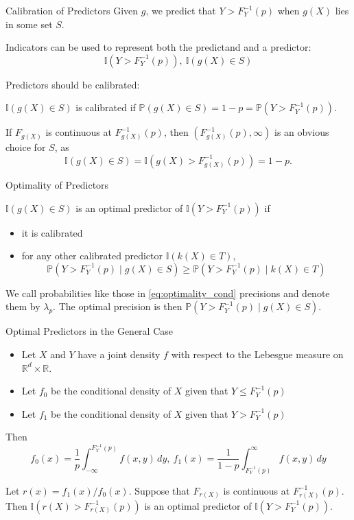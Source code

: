 \documentclass{beamer}
\def\I{\mathbb I}
\def\P{\mathbb P}
\def\R{\mathbb R}
\begin{document}
\begin{frame}{Calibration of Predictors}
    Given $g$, we predict that $Y > F_Y^{-1}(p)$ when $g(X)$ lies in some set $S$.

    Indicators can be used to represent both the predictand and a predictor:
    \[
    \I(Y > F_Y^{-1}(p)), \ \I(g(X) \in S)
    \]

    Predictors should be calibrated:
    \begin{definition}
        $\I(g(X) \in S)$ is calibrated if $\P(g(X) \in S) = 1 - p = \P(Y > F_Y^{-1}(p))$.
    \end{definition}
    If $F_{g(X)}$ is continuous at $F_{g(X)}^{-1}(p)$, then $(F_{g(X)}^{-1}(p), \infty)$ is an obvious choice for $S$, as
    \[
    \I(g(X) \in S) = \I(g(X) > F_{g(X)}^{-1}(p)) = 1 - p.
    \]
\end{frame}

\begin{frame}{Optimality of Predictors}
    \begin{definition}
        $\I(g(X) \in S)$ is an optimal predictor of $\I(Y > F_Y^{-1}(p))$ if
        \begin{itemize}
            \item it is calibrated
            \item for any other calibrated predictor $\I(k(X) \in T)$,
            \begin{equation}\label{eq:optimality_cond}
                \P(Y > F_Y^{-1}(p) \mid g(X) \in S) \ge \P(Y > F_Y^{-1}(p) \mid k(X) \in T)
            \end{equation}
        \end{itemize}
    \end{definition}
    We call probabilities like those in \eqref{eq:optimality_cond} precisions and denote them by $\lambda_p$. The optimal precision is then $\P(Y > F_Y^{-1}(p) \mid g(X) \in S)$.
\end{frame}

\begin{frame}{Optimal Predictors in the General Case}
    \begin{itemize}
        \item Let $X$ and $Y$ have a joint density $f$ with respect to the Lebesgue measure on $\R^d \times \mathbb{R}$.
        \item Let $f_0$ be the conditional density of $X$ given that $Y \le F_Y^{-1}(p)$
        \item Let $f_1$ be the conditional density of $X$ given that $Y > F_Y^{-1}(p)$
    \end{itemize}
    Then
    \[
    f_0(x) = \frac{1}{p}\int_{-\infty}^{F_Y^{-1}(p)} f(x, y)\,dy, \
    f_1(x) = \frac{1}{1 - p}\int_{F_Y^{-1}(p)}^{\infty} f(x, y)\,dy
    \]
    \begin{theorem}
        Let $r(x) = f_1(x) / f_0(x)$. Suppose that $F_{r(X)}$ is continuous at $F_{r(X)}^{-1}(p)$. Then $\I(r(X) > F_{r(X)}^{-1}(p))$ is an optimal predictor of $\I(Y > F_Y^{-1}(p))$.
    \end{theorem}
\end{frame}
\end{document}
